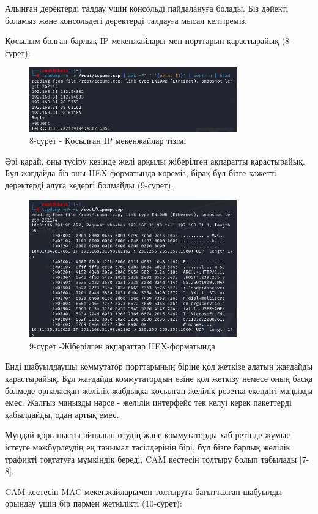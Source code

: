 \begin{multicols}{2}
Алынған деректерді талдау үшін консольді пайдалануға болады. Біз дәйекті
боламыз және консольдегі деректерді талдауға мысал келтіреміз.

Қосылым болған барлық IP мекенжайлары мен порттарын қарастырайық
(8-сурет):
\end{multicols}

\begin{figure}[H]
	\centering
	\includegraphics[width=0.8\textwidth]{assets/32}
	\caption*{8-сурет - Қосылған IP мекенжайлар тізімі}
\end{figure}

\begin{multicols}{2}
Әрі қарай, оны түсіру кезінде желі арқылы жіберілген ақпаратты
қарастырайық. Бұл жағдайда біз оны HEX форматында көреміз, бірақ бұл
бізге қажетті деректерді алуға кедергі болмайды (9-сурет).
\end{multicols}

\begin{figure}[H]
	\centering
	\includegraphics[width=0.8\textwidth]{assets/33}
	\caption*{9-сурет -Жіберілген ақпараттар HEX-форматында}
\end{figure}

\begin{multicols}{2}
Енді шабуылдаушы коммутатор порттарының біріне қол жеткізе алатын
жағдайды қарастырайық. Бұл жағдайда коммутатордың өзіне қол жеткізу
немесе оның басқа бөлмеде орналасқан желілік жабдыққа қосылған желілік
розетка екендігі маңызды емес. Жалғыз маңызды нәрсе - желілік интерфейс
тек келуі керек пакеттерді қабылдайды, одан артық емес.

Мұндай қорғанысты айналып өтудің және коммутаторды хаб ретінде жұмыс
істеуге мәжбүрлеудің ең танымал тәсілдерінің бірі, бұл бізге барлық
желілік трафикті тоқтатуға мүмкіндік береді, CAM кестесін толтыру болып
табылады {[}7-8{]}.

CAM кестесін MAC мекенжайларымен толтыруға бағытталған шабуылды орындау
үшін бір пәрмен жеткілікті (10-сурет):
\end{multicols}

